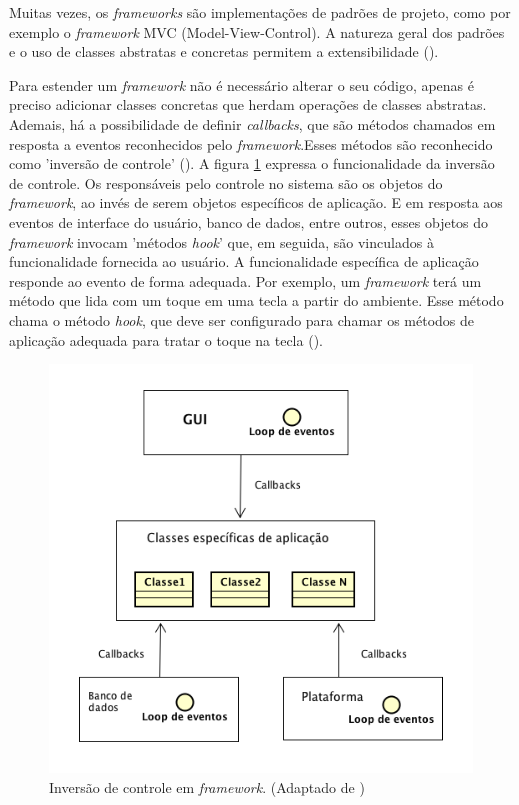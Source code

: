Muitas vezes, os \textit{frameworks} são implementações de padrões de projeto, como por exemplo o \textit{framework} MVC (Model-View-Control). A natureza geral dos padrões e o uso de classes abstratas e concretas permitem a extensibilidade (\cite{sommerville:2013}).

Para estender um \textit{framework} não é necessário alterar o seu código, apenas é preciso adicionar classes concretas que herdam operações de classes abstratas. Ademais, há a possibilidade de definir \textit{callbacks}, que são métodos chamados em resposta a eventos reconhecidos pelo \textit{framework}.Esses métodos são reconhecido como 'inversão de controle' (\cite{schmidt:2004}). A figura \ref{inversaodecontrole} expressa o funcionalidade da inversão de controle. Os responsáveis pelo controle no sistema são os objetos do \textit{framework}, ao invés de serem objetos específicos de aplicação. E em resposta aos eventos de interface do usuário, banco de dados, entre outros, esses objetos do \textit{framework} invocam 'métodos \textit{hook}' que, em seguida, são vinculados à funcionalidade fornecida ao usuário. A funcionalidade específica de aplicação responde ao evento de forma adequada. Por exemplo, um \textit{framework} terá um método que lida com um toque em uma tecla a partir do ambiente. Esse método chama o método \textit{hook}, que deve ser configurado para chamar os métodos de aplicação adequada para tratar o toque na tecla (\cite{sommerville:2013}).

\begin{figure}[h!]
	\centering
	\includegraphics[scale=0.6]{fig/inversaodecontrole.png}
	\caption{Inversão de controle em \textit{framework}. (Adaptado de \cite{sommerville:2013})}
	\label{inversaodecontrole}
\end{figure}

